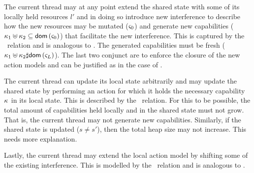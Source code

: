 %
%
The current thread may at any point extend the shared state with some of its locally held resources $l'$ and in doing so introduce new interference to describe how the new resources may be mutated ($\varsigma_{0}$) and generate  new capabilities ($\kappa_{1} \uplus \kappa_{2} \subseteq \textsf{dom}\left( \varsigma_{0} \right)$) that facilitate the new interference. This is captured by the \extendG\ relation and is analogous to \extendR.  The generated capabilities must be fresh ($\kappa_{1} \uplus \kappa_{2}  \sharp \textsf{dom}\left( \varsigma_{L} \right)$). The last two conjunct are to enforce the closure of the new action models and can be justified as in the case of \extendR.

The current thread can update its local state arbitrarily and may update the shared state by performing an action for which it holds the necessary capability $\kappa_{}$ in its local state. This is described by the \updateG\ relation. For this to be possible, the total amount of capabilities held locally and in the shared state must not grow. That is, the current thread may not generate new capabilities. Similarly, if the shared state is updated ($s \not= s'$),  then the total heap size may not increase. 
\todo This needs more explanation.

Lastly, the current thread may extend the local action model by shifting some of the existing interference. This is modelled by the \shiftG\ relation and is analogous to \shiftR.
%	

